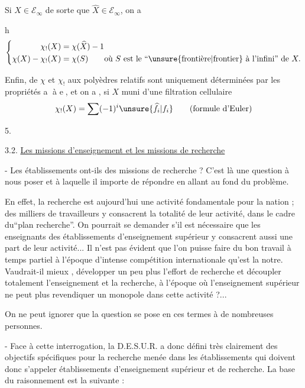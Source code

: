 Si  $X\in\mathcal E_\infty$ de sorte que $\widehat X\in\mathcal E_\infty$, on a

\textcircled{h}
\[
\left\{\begin{aligned}
\chi_!(X)&=\chi(\widehat X)-1\\
\chi(X)-\chi_!(X)&=\chi(S)\qquad\text{où }S\text{ est le ``}\unsure{\text{frontière}|\text{frontier}}\text{ à l'infini'' de }X.
\end{aligned}\right.
\]

Enfin,  de  $\chi$ et $\chi_!$ aux polyèdres relatifs sont uniquement déterminées par les propriétés \textcircled{a} à \textcircled{e}, et on a , si $X$ muni d'une filtration cellulaire
\[
\chi_!(X)=\sum(-1)^i\unsure{\widehat f_i|f_i}\qquad\text{(formule d'Euler)}
\]


\begin{flushright}5.\end{flushright}

3.2. \uline{Les missions d'enseignement et les missions de recherche}

- Les établissements ont-ils des missions de recherche ? C'est là une question à nous poser et à laquelle il importe de répondre en allant au fond du problème.

En effet, la recherche est aujourd'hui une activité fondamentale pour la nation ; des milliers de travailleurs y consacrent la totalité de leur activité, dans le cadre du``plan recherche''. On pourrait se demander s'il est nécessaire que les enseignants des établissements d'enseignement supérieur y consacrent aussi une part de leur activité... Il n'est pas évident que l'on puisse faire du bon travail à temps partiel à l'époque d'intense compétition internationale qu'est la notre. Vaudrait-il mieux , développer un peu plus l'effort de recherche et découpler totalement l'enseignement et la recherche, à l'époque où l'enseignement supérieur ne peut plus revendiquer un monopole dans cette activité ?...

On ne peut ignorer que la question se pose en ces termes à de nombreuses personnes.

- Face à cette interrogation, la D.E.S.U.R. a donc défini très clairement des objectifs spécifiques pour la recherche menée dans les établissements qui doivent donc s'appeler établissements d'enseignement supérieur et de recherche. La base du raisonnement est la suivante :

